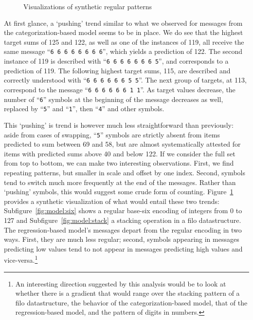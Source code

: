 \documentclass[twocolumn]{article}
\begin{document}
\begin{figure}
{
    }
    \caption{Visualizations of synthetic regular patterns}
    \label{fig:model}
\end{figure}


At first glance, a `pushing' trend similar to what we observed for messages from the categorization-based model seems to be in place.
We do see that the highest target sums of 125 and 122, as well as one of the instances of 119, all receive the same message ``\textcolor{Blues-K}{\tt 6~6~6~6~6~6~6~6}'', which yields a prediction of 122.
The second instance of 119 is described with ``{\tt \textcolor{Blues-K}{6~6~6~6~6~6~6}~\textcolor{Blues-I}{5}}'', and corresponds to a prediction of 119.
The following highest target sums, 115, are described and correctly understood with ``{\tt \textcolor{Blues-K}{6~6~6~6~6~6}~\textcolor{Blues-I}{5~5}}''. 
The next group of targets, at 113, correspond to the message ``{\tt \textcolor{Blues-K}{6~6~6~6~6~6}~\textcolor{Blues-G}{1~1}}''.
As target values decrease, the number of ``\textcolor{Blues-K}{\tt 6}'' symbols at the beginning of the message decreases as well, replaced by ``\textcolor{Blues-I}{\tt 5}'' and ``\textcolor{Blues-G}{\tt 1}'', then ``\textcolor{Blues-F}{\tt 4}'' and other symbols.

This `pushing' is trend is however much less straightforward than previously: aside from cases of swapping, ``\textcolor{Blues-I}{\tt 5}'' symbols are strictly absent from items predicted to sum between 69 and 58, but are almost systematically attested for items with predicted sums above 40 and below 122.
If we consider the full set from top to bottom, we can make two interesting observations.
First, we find repeating patterns, but smaller in scale and offset by one index.
Second, symbols tend to switch much more frequently at the end of the messages. 
Rather than `pushing' symbols, this would suggest some crude form of counting.
Figure~\ref{fig:model} provides a synthetic visualization of what would entail these two trends:
Subfigure~\ref{fig:model:six} shows a regular base-six encoding of integers from 0 to 127 and Subfigure~\ref{fig:model:stack} a stacking operation in a {\sc filo} datastructure.
The regression-based model's messages depart from the regular encoding in two ways.
First, they are much less regular; second, symbols appearing in messages predicting low values tend to not appear in messages predicting high values and vice-versa.\footnote{
    An interesting direction suggested by this analysis would be to look at whether there is a gradient that would range over the stacking pattern of a {\sc filo} datastructure, the behavior of the categorization-based model, that of the regression-based model, and the pattern of digits in numbers. 
}
\end{document}
